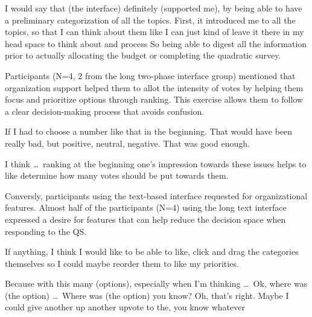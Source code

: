 \begin{displayquote}
I would say that (the interface) definitely (supported me), by being able to have a preliminary categorization of all the topics. First, it introduced me to all the topics, so that I can think about them like I can just kind of leave it there in my head space to think about and process \bracketellipsis So being able to digest all the information prior to actually allocating the budget or completing the quadratic survey. \hfill{}
\end{displayquote}

Participants (N=4, 2 from the long two-phase interface group) mentioned that organization support helped them to allot the intensity of votes by helping them focus and prioritize options through ranking. This exercise allows them to follow a clear decision-making process that avoids confusion.

\begin{displayquote}
If I had to choose a number like that in the beginning. That would have been really bad, but positive, neutral, negative. That was good enough. \hfill{}
\end{displayquote}

\begin{displayquote}
I think \ldots\ ranking at the beginning one's impression towards these issues helps to like determine how many votes should be put towards them.  \hfill{}
\end{displayquote}

Conversly, participants using the text-based interface requested for organizational features. Almost half of the participants (N=4) using the long text interface expressed a desire for features that can help reduce the decision space when responding to the QS.

\begin{displayquote}
If anything, I think I would like to be able to like, click and drag the categories themselves so I could maybe reorder them to like my priorities. \hfill{}
\end{displayquote}

\begin{displayquote}
Because with this many (options), especially when I'm thinking \ldots\ Ok, where was (the option) \ldots\ Where was (the option) you know? Oh, that's right. Maybe I could give another up another upvote to the, you know whatever~\bracketellipsis \hfill{}
\end{displayquote}

